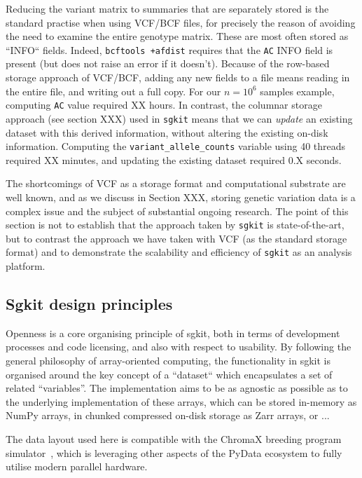 \documentclass[a4paper,num-refs]{oup-contemporary}
\newcommand{\toolname}[1]{\texttt{#1}}
\begin{document}
Reducing the variant matrix to summaries that are separately stored
is the standard practise when using VCF/BCF files, for precisely the
reason of avoiding the need to examine the entire genotype matrix.
These are most often stored as ``INFO`` fields.
Indeed, \toolname{bcftools +afdist} requires that the \texttt{AC}
INFO field is present (but does not raise an error
if it doesn't). Because of the row-based storage approach of
VCF/BCF, adding any new fields to a file means reading in the entire
file, and writing out a full copy. For our $n=10^6$ samples example,
computing \texttt{AC} value required XX hours.
In contrast, the columnar storage approach (see section XXX) used
in \toolname{sgkit} means that we can \emph{update} an existing
dataset with this derived information, without altering the existing
on-disk information.
Computing the
\texttt{variant\_allele\_counts} variable using
40 threads  required XX minutes, and updating the existing dataset required
0.X seconds.

The shortcomings of VCF as a storage format and computational
substrate are well known, and as we discuss in Section XXX,
storing genetic variation data is a complex issue
and the subject of substantial ongoing research. The point of this
section is not to establish that the approach taken by \toolname{sgkit}
is state-of-the-art, but to contrast the approach we have taken
with VCF (as the standard storage format) and to demonstrate
the scalability and efficiency of \toolname{sgkit} as an analysis
platform.


\subsection{Sgkit design principles}

Openness is a core organising principle of sgkit, both in terms of
development processes and code licensing, and also with respect
to usability. By following the general philosophy of array-oriented
computing, the functionality in sgkit is organised around the
key concept of a ``dataset`` which encapsulates a set of
related ``variables''. The implementation aims to be as agnostic
as possible as to the underlying implementation of these arrays,
which can be stored in-memory as NumPy arrays, in chunked
compressed on-disk storage as Zarr arrays, or ...

The data layout used here is compatible with the ChromaX
breeding program simulator~\citep{younis2023chromax}, which
is leveraging other aspects of the PyData ecosystem to
fully utilise modern parallel hardware.
\end{document}
